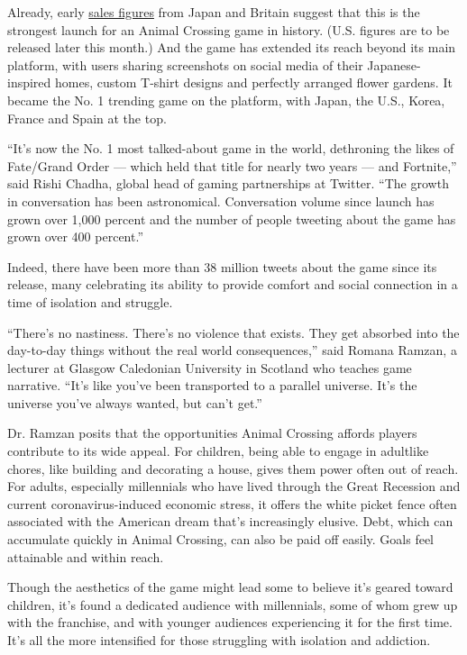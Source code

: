 Already, early
\href{https://www.theverge.com/2020/3/26/21195022/animal-crossing-switch-sales-japan-famitsu}{sales
figures} from Japan and Britain suggest that this is the strongest
launch for an Animal Crossing game in history. (U.S. figures are to be
released later this month.) And the game has extended its reach beyond
its main platform, with users sharing screenshots on social media of
their Japanese-inspired homes, custom T-shirt designs and perfectly
arranged flower gardens. It became the No. 1 trending game on the
platform, with Japan, the U.S., Korea, France and Spain at the top.

``It's now the No. 1 most talked-about game in the world, dethroning the
likes of Fate/Grand Order --- which held that title for nearly two years
--- and Fortnite,'' said Rishi Chadha, global head of gaming
partnerships at Twitter. ``The growth in conversation has been
astronomical. Conversation volume since launch has grown over 1,000
percent and the number of people tweeting about the game has grown over
400 percent.''

Indeed, there have been more than 38 million tweets about the game since
its release, many celebrating its ability to provide comfort and social
connection in a time of isolation and struggle.

``There's no nastiness. There's no violence that exists. They get
absorbed into the day-to-day things without the real world
consequences,'' said Romana Ramzan, a lecturer at Glasgow Caledonian
University in Scotland who teaches game narrative. ``It's like you've
been transported to a parallel universe. It's the universe you've always
wanted, but can't get.''

Dr. Ramzan posits that the opportunities Animal Crossing affords players
contribute to its wide appeal. For children, being able to engage in
adultlike chores, like building and decorating a house, gives them power
often out of reach. For adults, especially millennials who have lived
through the Great Recession and current coronavirus-induced economic
stress, it offers the white picket fence often associated with the
American dream that's increasingly elusive. Debt, which can accumulate
quickly in Animal Crossing, can also be paid off easily. Goals feel
attainable and within reach.

Though the aesthetics of the game might lead some to believe it's geared
toward children, it's found a dedicated audience with millennials, some
of whom grew up with the franchise, and with younger audiences
experiencing it for the first time. It's all the more intensified for
those struggling with isolation and addiction.

